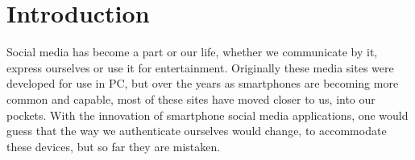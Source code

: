 

\chapter{Introduction}

\ifpdf
    \graphicspath{{1_introduction/figures/PNG/}{1_introduction/figures/PDF/}{1_introduction/figures/}}
\else
    \graphicspath{{1_introduction/figures/EPS/}{1_introduction/figures/}}
\fi





Social media has become a part or our life, whether we communicate by it, express ourselves or use it for entertainment. Originally these media sites were developed for use in PC, but over the years as smartphones are becoming more common and capable, most of these sites have moved closer to us, into our pockets. With the innovation of smartphone social media applications, one would guess that the way we authenticate ourselves would change, to accommodate these devices, but so far they are mistaken.


